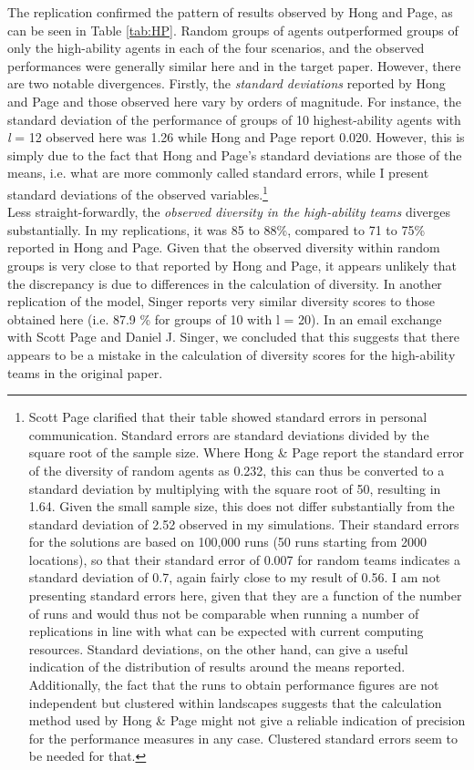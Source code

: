     
The replication confirmed the pattern of results observed by Hong and Page, as can be seen in Table \ref{tab:HP}. Random groups of agents outperformed groups of only the high-ability agents in each of the four scenarios, and the observed performances were generally similar here and in the target paper. However, there are two notable divergences. Firstly, the \textit{standard deviations} reported by Hong and Page and those observed here vary by orders of magnitude. For instance, the standard deviation of the performance of groups of 10 highest-ability agents with \textit{l} = 12 observed here was 1.26 while Hong and Page report 0.020. However, this is simply due to the fact that Hong and Page's standard deviations are those of the means, i.e. what are more commonly called standard errors, while I present standard deviations of the observed variables.\footnote{Scott Page clarified that their table showed standard errors in personal communication. Standard errors are standard deviations divided by the square root of the sample size. Where Hong \& Page report the standard error of the diversity of random agents as 0.232, this can thus be converted to a standard deviation by multiplying with the square root of 50, resulting in 1.64. Given the small sample size, this does not differ substantially from the standard deviation of 2.52 observed in my simulations. Their standard errors for the solutions are based on 100,000 runs (50 runs starting from 2000 locations), so that their standard error of 0.007 for random teams indicates a standard deviation of 0.7, again fairly close to my result of 0.56. I am not presenting standard errors here, given that they are a function of the number of runs and would thus not be comparable when running a number of replications in line with what can be expected with current computing resources. Standard deviations, on the other hand, can give a useful indication of the distribution of results around the means reported. Additionally, the fact that the runs to obtain performance figures are not independent but clustered within landscapes suggests that the calculation method used by Hong \& Page might not give a reliable indication of precision for the performance measures in any case. Clustered standard errors seem to be needed for that.} \\

Less straight-forwardly, the \textit{observed diversity in the high-ability teams} diverges substantially. In my replications, it was 85 to 88\%, compared to 71 to 75\% reported in Hong and Page. Given that the observed diversity within random groups is very close to that reported by Hong and Page, it appears unlikely that the discrepancy is due to differences in the calculation of diversity. In another replication of the model, Singer \supercite{singer2019diversity} reports very similar diversity scores to those obtained here (i.e. 87.9 \% for groups of 10 with l = 20). In an email exchange with Scott Page and Daniel J. Singer, we concluded that this suggests that there appears to be a mistake in the calculation of diversity scores for the high-ability teams in the original paper. \\

